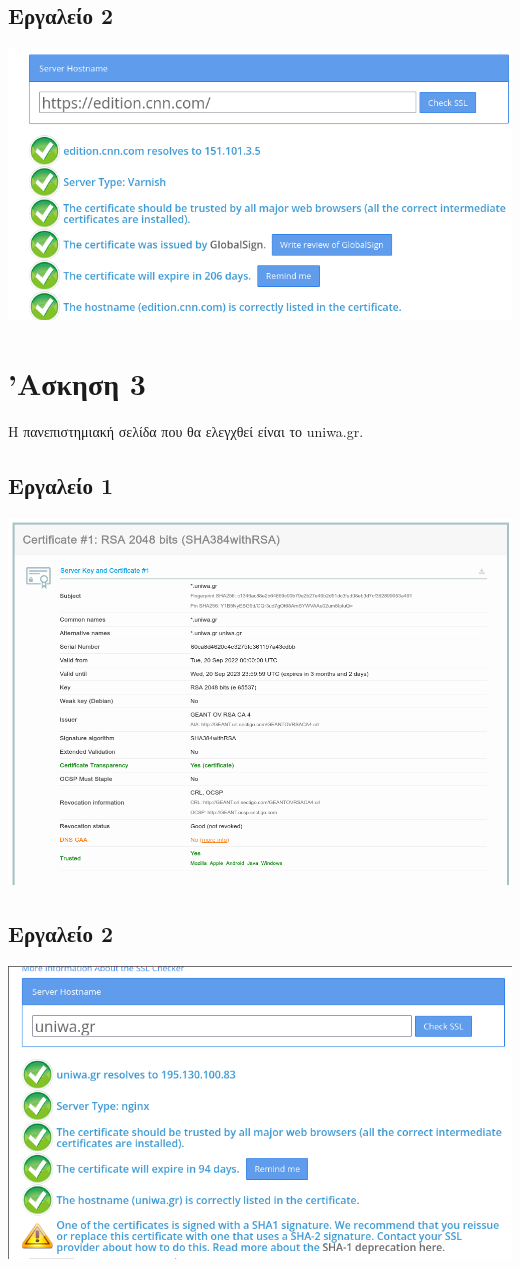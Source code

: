 \documentclass[12pt]{article}
\begin{document}
\subsection{Εργαλείο 2}

\includegraphics[width=\textwidth]{res/cnn2.png} \\

\section{'Ασκηση 3}

Η πανεπιστημιακή σελίδα που θα ελεγχθεί είναι το uniwa.gr. 

\subsection{Εργαλείο 1}

\includegraphics[width=\textwidth]{res/uniwa1.png} \\

\subsection{Εργαλείο 2}

\includegraphics[width=\textwidth]{res/uniwa2.png} \\
\end{document}

